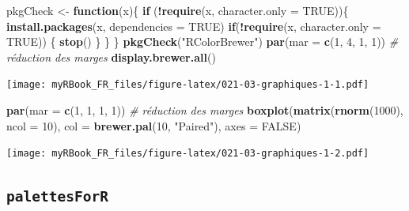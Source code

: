 \documentclass[
]{book}
\newenvironment{Shaded}{\begin{snugshade}}{\end{snugshade}}
\newcommand{\CommentTok}[1]{\textcolor[rgb]{0.56,0.35,0.01}{\textit{#1}}}
\newcommand{\ControlFlowTok}[1]{\textcolor[rgb]{0.13,0.29,0.53}{\textbf{#1}}}
\newcommand{\DataTypeTok}[1]{\textcolor[rgb]{0.13,0.29,0.53}{#1}}
\newcommand{\DecValTok}[1]{\textcolor[rgb]{0.00,0.00,0.81}{#1}}
\newcommand{\KeywordTok}[1]{\textcolor[rgb]{0.13,0.29,0.53}{\textbf{#1}}}
\newcommand{\NormalTok}[1]{#1}
\newcommand{\OperatorTok}[1]{\textcolor[rgb]{0.81,0.36,0.00}{\textbf{#1}}}
\newcommand{\OtherTok}[1]{\textcolor[rgb]{0.56,0.35,0.01}{#1}}
\newcommand{\StringTok}[1]{\textcolor[rgb]{0.31,0.60,0.02}{#1}}
\begin{document}
\begin{Shaded}
\begin{Highlighting}[]
\NormalTok{pkgCheck <-}\StringTok{ }\ControlFlowTok{function}\NormalTok{(x)\{ }
    \ControlFlowTok{if}\NormalTok{ (}\OperatorTok{!}\KeywordTok{require}\NormalTok{(x, }\DataTypeTok{character.only =} \OtherTok{TRUE}\NormalTok{))\{}
        \KeywordTok{install.packages}\NormalTok{(x, }\DataTypeTok{dependencies =} \OtherTok{TRUE}\NormalTok{)}
        \ControlFlowTok{if}\NormalTok{(}\OperatorTok{!}\KeywordTok{require}\NormalTok{(x, }\DataTypeTok{character.only =} \OtherTok{TRUE}\NormalTok{)) \{}
            \KeywordTok{stop}\NormalTok{()}
\NormalTok{        \}}
\NormalTok{    \}}
\NormalTok{\}}
\KeywordTok{pkgCheck}\NormalTok{(}\StringTok{"RColorBrewer"}\NormalTok{)}
\KeywordTok{par}\NormalTok{(}\DataTypeTok{mar =} \KeywordTok{c}\NormalTok{(}\DecValTok{1}\NormalTok{, }\DecValTok{4}\NormalTok{, }\DecValTok{1}\NormalTok{, }\DecValTok{1}\NormalTok{)) }\CommentTok{# réduction des marges}
\KeywordTok{display.brewer.all}\NormalTok{()}
\end{Highlighting}
\end{Shaded}

\texttt{[image: myRBook\_FR\_files/figure-latex/021-03-graphiques-1-1.pdf]}

\begin{Shaded}
\begin{Highlighting}[]
\KeywordTok{par}\NormalTok{(}\DataTypeTok{mar =} \KeywordTok{c}\NormalTok{(}\DecValTok{1}\NormalTok{, }\DecValTok{1}\NormalTok{, }\DecValTok{1}\NormalTok{, }\DecValTok{1}\NormalTok{)) }\CommentTok{# réduction des marges}
\KeywordTok{boxplot}\NormalTok{(}\KeywordTok{matrix}\NormalTok{(}\KeywordTok{rnorm}\NormalTok{(}\DecValTok{1000}\NormalTok{), }\DataTypeTok{ncol =} \DecValTok{10}\NormalTok{), }
  \DataTypeTok{col =} \KeywordTok{brewer.pal}\NormalTok{(}\DecValTok{10}\NormalTok{, }\StringTok{"Paired"}\NormalTok{), }\DataTypeTok{axes =} \OtherTok{FALSE}\NormalTok{)}
\end{Highlighting}
\end{Shaded}

\texttt{[image: myRBook\_FR\_files/figure-latex/021-03-graphiques-1-2.pdf]}

\hypertarget{palettesforr}{%
\subsection{\texorpdfstring{\texttt{palettesForR}}{palettesForR}}\label{palettesforr}}
\end{document}
